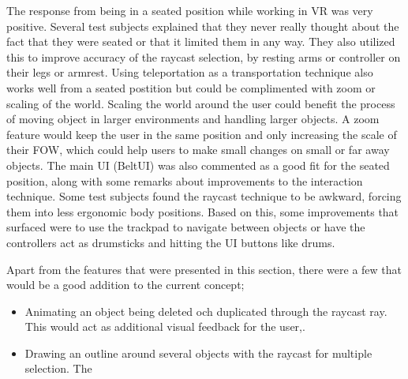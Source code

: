The response from being in a seated position while working in VR was very positive. Several test subjects explained that they never really thought about the fact that they were seated or that it limited them in any way. They also utilized this to improve accuracy of the raycast selection, by resting arms or controller on their legs or armrest.
Using teleportation as a transportation technique also works well from a seated postition but could be complimented with zoom or scaling of the world. Scaling the world around the user could benefit the process of moving object in larger environments and handling larger objects. A zoom feature would keep the user in the same position and only increasing the scale of their FOW, which could help users to make small changes on small or far away objects. The main UI (BeltUI) was also commented as a good fit for the seated position, along with some remarks about improvements to the interaction technique. Some test subjects found the raycast technique to be awkward, forcing them into less ergonomic body positions. Based on this, some improvements that surfaced were to use the trackpad to navigate between objects or have the controllers act as drumsticks and hitting the UI buttons like drums.

Apart from the features that were presented in this section, there were a few that would be a good addition to the current concept;

\begin{itemize}
  \item Animating an object being deleted och duplicated through the raycast ray. This would act as additional visual feedback for the user,.
  \item Drawing an outline around several objects with the raycast for multiple selection. The
\end{itemize}
